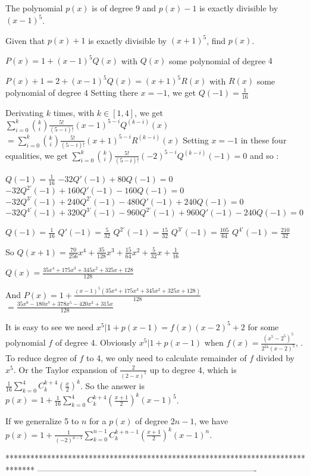 \begin{solution}
	\begin{tcolorbox}The polynomial $p(x)$ is of degree $9$ and $p(x)-1$ is exactly divisible by $(x-1)^{5}$.

Given that $p(x) + 1$ is exactly divisible by $(x+1)^{5}$, find $p(x)$.\end{tcolorbox}
$P(x)=1+(x-1)^5Q(x)$ with $Q(x)$ some polynomial of degree $4$

$P(x)+1=2+(x-1)^5Q(x)=(x+1)^5R(x)$ with $R(x)$ some polynomial of degree $4$
Setting there $x=-1$, we get $Q(-1)=\frac 1{16}$

Derivating $k$ times, with $k\in[1,4]$, we get $\sum_{i=0}^k\binom ki\frac{5!}{(5-i)!}(x-1)^{5-i}Q^{(k-i)}(x)$ $=\sum_{i=0}^k\binom ki\frac{5!}{(5-i)!}(x+1)^{5-i}R^{(k-i)}(x)$
Setting $x=-1$ in these four equalities, we get $\sum_{i=0}^k\binom ki\frac{5!}{(5-i)!}(-2)^{5-i}Q^{(k-i)}(-1)=0$ and so :

$Q(-1)=\frac 1{16}$
$-32Q'(-1)+80Q(-1)=0$
$-32Q^{2'}(-1)+160Q'(-1)-160Q(-1)=0$
$-32Q^{3'}(-1)+240Q^{2'}(-1)-480Q'(-1)+240Q(-1)=0$
$-32Q^{4'}(-1)+320Q^{3'}(-1)-960Q^{2'}(-1)+960Q'(-1)-240Q(-1)=0$

$Q(-1)=\frac 1{16}$
$Q'(-1)=\frac 5{32}$
$Q^{2'}(-1)=\frac {15}{32}$
$Q^{3'}(-1)=\frac {105}{64}$
$Q^{4'}(-1)=\frac {210}{32}$

So $Q(x+1)=\frac{70}{256}x^4+\frac{35}{128}x^3+\frac{15}{64}x^2+\frac{5}{32}x+\frac 1{16}$

$Q(x)=\frac{35x^4+175x^3+345x^2+325x+128}{128}$

And $P(x)=1+\frac{(x-1)^5(35x^4+175x^3+345x^2+325x+128)}{128}$ $=\boxed{\frac{35x^9-180x^7+378x^5-420x^3+315x}{128}}$
\end{solution}



\begin{solution}
	It is easy to see we need $x^5|1+p(x-1)=f(x)(x-2)^5+2$ for some polynomial $f$ of degree 4.
Obviously $x^5|1+p(x-1)$ when $f(x)=\frac{(x^5-2^5)^5}{2^{24}(x-2)^5}$, . 
To reduce degree of $f$ to 4, we only need to calculate remainder of $f$ divided by $x^5$. Or the Taylor expansion of $\frac{2}{(2-x)^5}$ up to degree 4, which is $\frac1{16}\sum_{k=0}^{4}C_k^{k+4}(\frac{x}2)^k$.
So the answer is $p(x)=1+\frac1{16}\sum_{k=0}^{4}C_k^{k+4}(\frac{x+1}2)^k(x-1)^5$.

If we generalize 5 to $n$ for a $p(x)$ of degree $2n-1$, we have
 $p(x)=1+\frac1{(-2)^{n-1}}\sum_{k=0}^{n-1}C_k^{k+n-1}(\frac{x+1}2)^k(x-1)^n$.
\end{solution}
*******************************************************************************
-------------------------------------------------------------------------------


